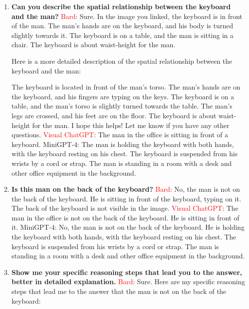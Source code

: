     \begin{enumerate}
        \item \textbf{Can you describe the spatial relationship between the keyboard and the man?}
        \subitem \textcolor{Red}{Bard}: 
        Sure. In the image you linked, the keyboard is in front of the man. The man's hands are on the keyboard, and his body is turned slightly towards it. The keyboard is on a table, and the man is sitting in a chair. The keyboard is about waist-height for the man.

        Here is a more detailed description of the spatial relationship between the keyboard and the man:

        The keyboard is located in front of the man's torso.
        The man's hands are on the keyboard, and his fingers are typing on the keys.
        The keyboard is on a table, and the man's torso is slightly turned towards the table.
        The man's legs are crossed, and his feet are on the floor.
        The keyboard is about waist-height for the man.
        I hope this helps! Let me know if you have any other questions.
        \subitem \textcolor{red}{Visual ChatGPT}: The man in the office is sitting in front of a keyboard.
        \subitem MiniGPT-4: The man is holding the keyboard with both hands, with the keyboard resting on his chest. The keyboard is suspended from his wrists by a cord or strap. The man is standing in a room with a desk and other office equipment in the background.
        \item \textbf{Is this man on the back of the keyboard?}
        \subitem \textcolor{Red}{Bard}: 
        No, the man is not on the back of the keyboard. He is sitting in front of the keyboard, typing on it. The back of the keyboard is not visible in the image.
        \subitem \textcolor{Red}{Visual ChatGPT}: The man in the office is not on the back of the keyboard. He is sitting in front of it.
        \subitem MiniGPT-4: No, the man is not on the back of the keyboard. He is holding the keyboard with both hands, with the keyboard resting on his chest. The keyboard is suspended from his wrists by a cord or strap. The man is standing in a room with a desk and other office equipment in the background.
        \item \textbf{Show me your specific reasoning steps that lead you to the answer, better in detailed explanation.}
        \subitem \textcolor{Red}{Bard}: 
        Sure. Here are my specific reasoning steps that lead me to the answer that the man is not on the back of the keyboard:
        

\end{enumerate}
